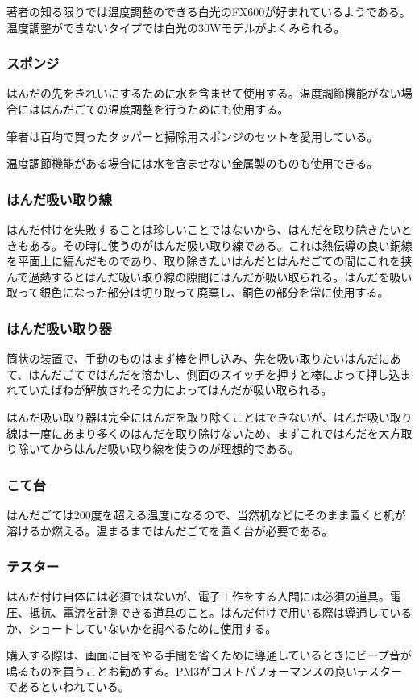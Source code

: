 \documentclass[a4paper,titlepage,here]{ujarticle}
\begin{document}
著者の知る限りでは温度調整のできる白光のFX600が好まれているようである。温度調整ができないタイプでは白光の30Wモデルがよくみられる。
\subsubsection{スポンジ}
はんだの先をきれいにするために水を含ませて使用する。温度調節機能がない場合にははんだごての温度調整を行うためにも使用する。

筆者は百均で買ったタッパーと掃除用スポンジのセットを愛用している。

温度調節機能がある場合には水を含ませない金属製のものも使用できる。
\subsubsection{はんだ吸い取り線}
はんだ付けを失敗することは珍しいことではないから、はんだを取り除きたいときもある。その時に使うのがはんだ吸い取り線である。これは熱伝導の良い銅線を平面上に編んだものであり、取り除きたいはんだとはんだごての間にこれを挟んで過熱するとはんだ吸い取り線の隙間にはんだが吸い取られる。はんだを吸い取って銀色になった部分は切り取って廃棄し、銅色の部分を常に使用する。
\subsubsection{はんだ吸い取り器}
筒状の装置で、手動のものはまず棒を押し込み、先を吸い取りたいはんだにあて、はんだごてではんだを溶かし、側面のスイッチを押すと棒によって押し込まれていたばねが解放されその力によってはんだが吸い取られる。

はんだ吸い取り器は完全にはんだを取り除くことはできないが、はんだ吸い取り線は一度にあまり多くのはんだを取り除けないため、まずこれではんだを大方取り除いてからはんだ吸い取り線を使うのが理想的である。
\subsubsection{こて台}
はんだごては200度を超える温度になるので、当然机などにそのまま置くと机が溶けるか燃える。温まるまではんだごてを置く台が必要である。
\subsubsection{テスター}
はんだ付け自体には必須ではないが、電子工作をする人間には必須の道具。電圧、抵抗、電流を計測できる道具のこと。はんだ付けで用いる際は導通しているか、ショートしていないかを調べるために使用する。

購入する際は、画面に目をやる手間を省くために導通しているときにビープ音が鳴るものを買うことお勧めする。PM3がコストパフォーマンスの良いテスターであるといわれている。
\end{document}
